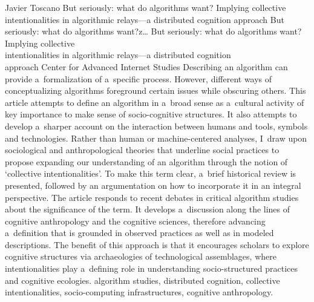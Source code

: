 \begin{artengenv}{Javier Toscano}
	{But seriously: what do algorithms want? Implying collective intentionalities in algorithmic relays---a distributed cognition approach}
	{But seriously: what do algorithms want?z\ldots}
	{But seriously: what do algorithms want? Implying collective\\intentionalities in algorithmic relays---a distributed cognition\\approach}
	{Center for Advanced Internet Studies}
	{Describing an algorithm can provide a~formalization of a~specific process. However, different ways of conceptualizing algorithms foreground certain issues while obscuring others. This article attempts to define an algorithm in a~broad sense as a~cultural activity of key importance to make sense of socio-cognitive structures. It also attempts to develop a~sharper account on the interaction between humans and tools, symbols and technologies. Rather than human or machine-centered analyses, I~draw upon sociological and anthropological theories that underline social practices to propose expanding our understanding of an algorithm through the notion of ‘collective intentionalities'. To make this term clear, a~brief historical review is presented, followed by an argumentation on how to incorporate it in an integral perspective. The article responds to recent debates in critical algorithm studies about the significance of the term. It develops a~discussion along the lines of cognitive anthropology and the cognitive sciences, therefore advancing a~definition that is grounded in observed practices as well as in modeled descriptions. The benefit of this approach is that it encourages scholars to explore cognitive structures via archaeologies of technological assemblages, where intentionalities play a~defining role in understanding socio-structured practices and cognitive ecologies.
	}
	{algorithm studies, distributed cognition, collective intentionalities, socio-computing infrastructures, cognitive anthropology.}
	

\end{artengenv}
